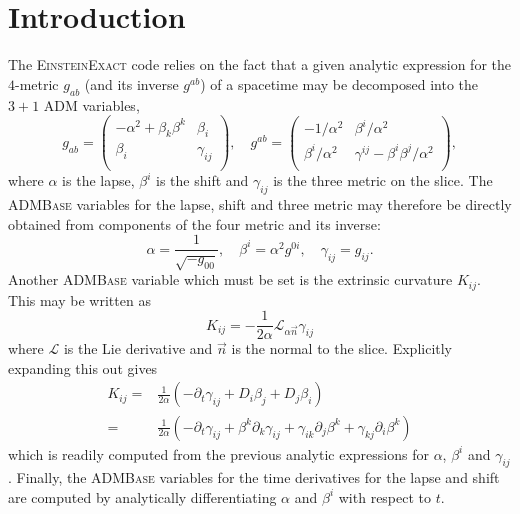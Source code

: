\documentclass{article}
\begin{document}
\section{Introduction}
The \textsc{EinsteinExact} code relies on the fact that a given analytic
expression for the $4$-metric $g_{ab}$ (and its inverse $g^{ab}$) of a spacetime
may be decomposed into the $3+1$ ADM variables,
\begin{equation}
g_{ab} =
\left(
\begin{array}{cc}
 -\alpha^2 + \beta_k \beta^k & \beta_i \\
 \beta_i & \gamma_{ij}\\
\end{array}
\right),\quad
g^{ab} =
\left(
\begin{array}{cc}
 -1/\alpha^2 & \beta^i / \alpha^2 \\
 \beta^i / \alpha^2 & \gamma^{ij} - \beta^i \beta^j / \alpha^2\\
\end{array}
\right),
\end{equation}
where $\alpha$ is the lapse, $\beta^i$ is the shift and $\gamma_{ij}$
is the three metric on the slice. The \textsc{ADMBase} variables for the
lapse, shift and three metric may therefore be directly obtained from
components of the four metric and its inverse:
\begin{equation}
\alpha = \frac{1}{\sqrt{-g_{00}}},\quad
\beta^i = \alpha^2 g^{0i},\quad
\gamma_{ij} = g_{ij}.
\end{equation}
Another \textsc{ADMBase} variable which must be set is the extrinsic
curvature $K_{ij}$. This may be written as
\begin{equation}
K_{ij} = -\frac{1}{2\alpha} \mathcal{L}_{\alpha \vec{n}} \gamma_{ij}
\end{equation}
where $\mathcal{L}$ is the Lie derivative and $\vec{n}$ is the normal to the
slice. Explicitly expanding this out gives
\begin{align}
K_{ij} = & \frac{1}{2\alpha} (-\partial_t \gamma_{ij} + D_i \beta_j + D_j \beta_i) \nonumber \\
 = &  \frac{1}{2\alpha} (-\partial_t \gamma_{ij}
        + \beta^k \partial_k \gamma_{ij}
        + \gamma_{ik} \partial_j \beta^k
        + \gamma_{kj} \partial_i \beta^k
      )
\end{align}
which is readily computed from the previous analytic expressions for $\alpha$,
$\beta^i$ and $\gamma_{ij}$. Finally, the \textsc{ADMBase} variables for the time
derivatives for the lapse and shift are computed by analytically differentiating
$\alpha$ and $\beta^i$ with respect to $t$.
\end{document}
